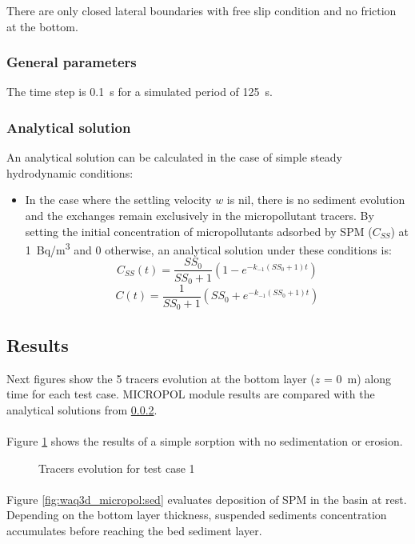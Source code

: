 There are only closed lateral boundaries with free slip condition
and no friction at the bottom.

\subsubsection{General parameters}

The time step is 0.1~s for a simulated period of 125~s.

\subsubsection{Analytical solution}
\label{Analytical}
An analytical solution can be calculated in the case of simple steady hydrodynamic conditions:
\begin{itemize}
\item In the case where the settling velocity $w$ is nil, there is no
  sediment evolution and the exchanges remain exclusively in the
  micropollutant tracers. By setting the initial concentration of
  micropollutants adsorbed by SPM ($C_{SS}$) at 1~Bq/m\textsuperscript{3}
  and 0 otherwise, an analytical solution under these conditions is:
  $$ C_{SS}(t)=\frac{SS_0}{SS_0+1}(1-e^{-k_{-1}(SS_0+1)t})$$
  $$ C(t)=\frac{1}{SS_0+1}(SS_0+e^{-k_{-1}(SS_0+1)t})$$
\end{itemize}

\subsection{Results}

Next figures show the 5 tracers evolution at the bottom layer ($z$ = 0~m) along time for each test case.
MICROPOL module results are compared with the analytical solutions from
\ref{Analytical}.

\paragraph{}
Figure \ref{fig:waq3d_micropol:sorp} shows the results of a simple sorption
with no sedimentation or erosion.

\begin{figure} [H]
\centering
{}
\caption{Tracers evolution for test case 1}
 \label{fig:waq3d_micropol:sorp}
\end{figure}

\paragraph{}
Figure \ref{fig:waq3d_micropol:sed} evaluates deposition of SPM in the
basin at rest. Depending on the bottom layer thickness, suspended sediments concentration accumulates before reaching the bed sediment layer.

